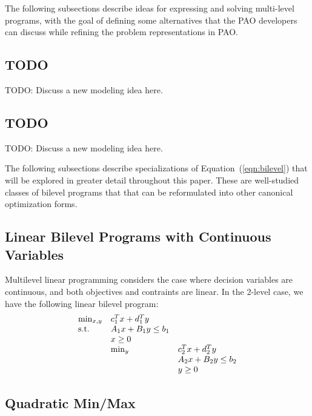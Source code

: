 The following subsections describe ideas for expressing and solving multi-level programs, with the
goal of defining some alternatives that the PAO developers can discuss while refining the 
problem representations in PAO.

\subsection{TODO}

TODO: Discuss a new modeling idea here.

\subsection{TODO}

TODO: Discuss a new modeling idea here.



\label{sec:problems}

The following subsections describe specializations of
Equation~(\ref{eqn:bilevel}) that will be explored in greater detail
throughout this paper.  These are well-studied classes of bilevel
programs that that can be reformulated into other canonical
optimization forms.


\subsection{Linear Bilevel Programs with Continuous Variables}

Multilevel linear programming considers the case where decision
variables are continuous, and both objectives and contraints are
linear.  In the 2-level case, we have the following linear bilevel program:
\begin{equation}
\label{eqn:bilevel_A}
\begin{array}{lll}
\min_{x, y}         & c^T_1 x + d^T_1 y & \\
\textrm{s.t.}                 & A_1 x + B_1 y \leq b_1 & \\
                    & x \geq 0 & \\
                    & \min_{y}  & c^T_2 x + d^T_2 y\\
                    &           & A_2 x + B_2 y \leq b_2\\
                    &           & y \geq 0
\end{array}
\end{equation}


\subsection{Quadratic Min/Max}

